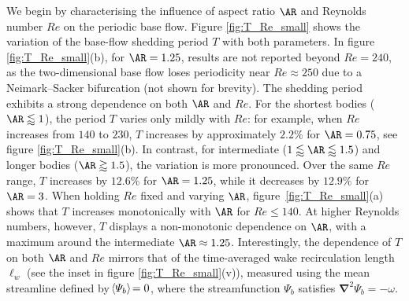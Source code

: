 We begin by characterising the influence of aspect ratio $\AR$ and Reynolds number $Re$ on the periodic base flow. Figure \ref{fig:T_Re_small} shows the variation of the base-flow shedding period $T$ with both parameters. In figure \ref{fig:T_Re_small}(b), for $\AR=1.25$, results are not reported beyond $Re=240$, as the two-dimensional base flow loses periodicity near $Re \approx 250$ due to a Neimark–Sacker bifurcation (not shown for brevity).
%
The shedding period exhibits a strong dependence on both $\AR$ and $Re$. For the shortest bodies ($\AR \lessapprox 1$), the period $T$ varies only mildly with $Re$: for example, when $Re$ increases from $140$ to $230$, $T$ increases by approximately $2.2\%$ for $\AR=0.75$, see figure \ref{fig:T_Re_small}(b). In contrast, for intermediate ($1 \lessapprox \AR \lessapprox 1.5$) and longer bodies ($\AR \gtrapprox 1.5$), the variation is more pronounced. Over the same $Re$ range, $T$ increases by $12.6\%$ for $\AR=1.25$, while it decreases by $12.9\%$ for $\AR=3$.
%
When holding $Re$ fixed and varying $\AR$, figure~\ref{fig:T_Re_small}(a) shows that $T$ increases monotonically with $\AR$ for $Re \le 140$. At higher Reynolds numbers, however, $T$ displays a non-monotonic dependence on $\AR$, with a maximum around the intermediate $\AR \approx 1.25$. Interestingly, the dependence of $T$ on both $\AR$ and $Re$ mirrors that of the time-averaged wake recirculation length $\ell_w$ (see the inset in figure \ref{fig:T_Re_small}(v)), measured using the mean streamline defined by $\! \left\langle {\varPsi_b} \right \rangle \! = 0$, where the streamfunction $\Psi_b$ satisfies $\bm{\nabla}^2 \Psi_b = - \omega$.


